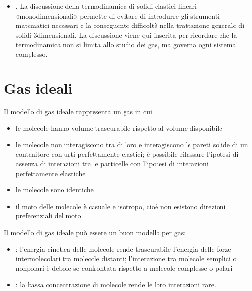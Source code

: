 \documentclass[letterpaper,10pt,italian]{jupyterBook}
\begin{document}
\begin{itemize}
\item {} 
\sphinxAtStartPar
{\hyperref[\detokenize{ch/thermodynamics/elastic-solid-1d:physics-hs-thermodynamics-matter-elastic-1d}]{}}. La discussione della termodinamica di solidi elastici lineari «monodimensionali» permette di evitare di introdurre gli strumenti matematici necessari e la conseguente difficoltà nella trattazione generale di solidi 3\sphinxhyphen{}dimensionali. La discussione viene qui inserita per ricordare che la termodinamica non si limita allo studio dei gas, ma governa ogni sistema complesso.

\end{itemize}

\sphinxstepscope


\section{Gas ideali}
\label{\detokenize{ch/thermodynamics/ideal-gas:gas-ideali}}\label{\detokenize{ch/thermodynamics/ideal-gas:physics-hs-thermodynamics-matter-gases-ideal}}\label{\detokenize{ch/thermodynamics/ideal-gas::doc}}
\sphinxAtStartPar
Il modello di gas ideale rappresenta un gas in cui
\begin{itemize}
\item {} 
\sphinxAtStartPar
le molecole hanno volume trascurabile rispetto al volume disponibile

\item {} 
\sphinxAtStartPar
le molecole non interagiscono tra di loro e interagiscono le pareti solide di un contenitore con urti perfettamente elastici; è possibile rilassare l’ipotesi di assenza di interazioni tra le particelle con l’ipotesi di interazioni perfettamente elastiche

\item {} 
\sphinxAtStartPar
le molecole sono identiche

\item {} 
\sphinxAtStartPar
il moto delle molecole è casuale e isotropo, cioè non esistono direzioni preferenziali del moto

\end{itemize}

\sphinxAtStartPar
Il modello di gas ideale può essere un buon modello per gas:
\begin{itemize}
\item {} 
\sphinxAtStartPar
{}: l’energia cinetica delle molecole rende trascurabile l’energia delle forze intermolecolari tra molecole distanti; l’interazione tra molecole semplici o non\sphinxhyphen{}polari è debole se confrontata rispetto a molecole complesse o polari

\item {} 
\sphinxAtStartPar
{}: la bassa concentrazione di molecole rende le loro interazioni rare.

\end{itemize}
\end{document}
